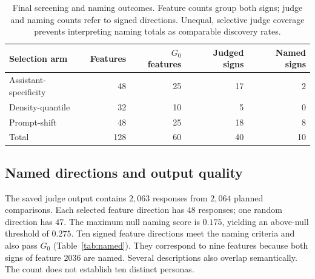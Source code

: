 \documentclass[11pt]{article}
\begin{document}
\begin{table}[htbp]\centering\small
\begin{tabular}{lrrrr}
\toprule
Selection arm & Features & $G_0$ features & Judged signs & Named signs \\
\midrule
Assistant-specificity & 48 & 25 & 17 & 2 \\
Density-quantile & 32 & 10 & 5 & 0 \\
Prompt-shift & 48 & 25 & 18 & 8 \\
\midrule
Total & 128 & 60 & 40 & 10 \\
\bottomrule
\end{tabular}
\caption{Final screening and naming outcomes. Feature counts group both signs;
judge and naming counts refer to signed directions. Unequal, selective judge
coverage prevents interpreting naming totals as comparable discovery rates.}
\label{tab:arms}
\end{table}

\subsection{Named directions and output quality}
The saved judge output contains $2{,}063$ responses from $2{,}064$ planned
comparisons. Each selected feature direction has $48$ responses; one random
direction has $47$. The maximum null naming score is $0.175$, yielding an
above-null threshold of $0.275$. Ten signed feature directions meet the naming
criteria and also pass $G_0$ (Table~\ref{tab:named}). They correspond to nine
features because both signs of feature $2036$ are named. Several descriptions
also overlap semantically. The count does not establish ten distinct personas.
\end{document}
